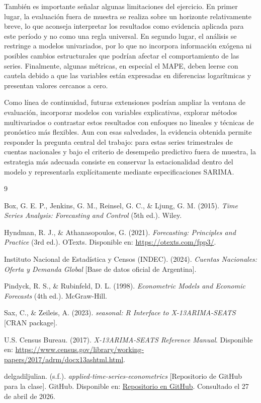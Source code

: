 \documentclass[11pt]{article}
\begin{document}
También es importante señalar algunas limitaciones del ejercicio. En primer lugar, la evaluación fuera de muestra se realiza sobre un horizonte relativamente breve, lo que aconseja interpretar los resultados como evidencia aplicada para este período y no como una regla universal. En segundo lugar, el análisis se restringe a modelos univariados, por lo que no incorpora información exógena ni posibles cambios estructurales que podrían afectar el comportamiento de las series. Finalmente, algunas métricas, en especial el MAPE, deben leerse con cautela debido a que las variables están expresadas en diferencias logarítmicas y presentan valores cercanos a cero.

Como línea de continuidad, futuras extensiones podrían ampliar la ventana de evaluación, incorporar modelos con variables explicativas, explorar métodos multivariados o contrastar estos resultados con enfoques no lineales y técnicas de pronóstico más flexibles. Aun con esas salvedades, la evidencia obtenida permite responder la pregunta central del trabajo: para estas series trimestrales de cuentas nacionales y bajo el criterio de desempeño predictivo fuera de muestra, la estrategia más adecuada consiste en conservar la estacionalidad dentro del modelo y representarla explícitamente mediante especificaciones SARIMA.

\begin{thebibliography}{9}

Box, G. E. P., Jenkins, G. M., Reinsel, G. C., \& Ljung, G. M. (2015).
\textit{Time Series Analysis: Forecasting and Control} (5th ed.). Wiley.

Hyndman, R. J., \& Athanasopoulos, G. (2021).
\textit{Forecasting: Principles and Practice} (3rd ed.). OTexts.
Disponible en: \url{https://otexts.com/fpp3/}.

Instituto Nacional de Estadística y Censos (INDEC). (2024).
\textit{Cuentas Nacionales: Oferta y Demanda Global} [Base de datos oficial de Argentina].

Pindyck, R. S., \& Rubinfeld, D. L. (1998).
\textit{Econometric Models and Economic Forecasts} (4th ed.). McGraw-Hill.

Sax, C., \& Zeileis, A. (2023).
\textit{seasonal: R Interface to X-13ARIMA-SEATS} [CRAN package].

U.S. Census Bureau. (2017).
\textit{X-13ARIMA-SEATS Reference Manual}.
Disponible en: \url{https://www.census.gov/library/working-papers/2017/adrm/docx13ashtml.html}.

delgadiljulian. (s.f.).
\textit{applied-time-series-econometrics} [Repositorio de GitHub para la clase]. GitHub.
Disponible en: \href{https://github.com/delgadiljulian/applied-time-series-econometrics}{Repositorio en GitHub}. Consultado el 27 de abril de 2026.

\end{thebibliography}
\end{document}
